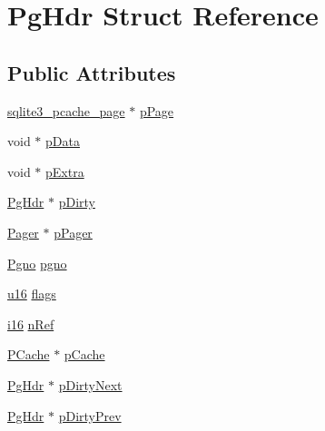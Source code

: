\hypertarget{struct_pg_hdr}{\section{Pg\-Hdr Struct Reference}
\label{struct_pg_hdr}
}
\subsection*{Public Attributes}
\begin{DoxyCompactItemize}
\item 
\hyperlink{structsqlite3__pcache__page}{sqlite3\-\_\-pcache\-\_\-page} $\ast$ \hyperlink{struct_pg_hdr_aa5645976ba0634993a7304dce8856c8b}{p\-Page}
\item 
void $\ast$ \hyperlink{struct_pg_hdr_a0f9f2ac8492c0cdad5898036db20b798}{p\-Data}
\item 
void $\ast$ \hyperlink{struct_pg_hdr_a8ff7430ed04077f1ae20d10801968164}{p\-Extra}
\item 
\hyperlink{struct_pg_hdr}{Pg\-Hdr} $\ast$ \hyperlink{struct_pg_hdr_a7732b1c0f19d9555ac93d4879fc95bbd}{p\-Dirty}
\item 
\hyperlink{struct_pager}{Pager} $\ast$ \hyperlink{struct_pg_hdr_aaa4879a9510c8a819a1e10a8ee21495b}{p\-Pager}
\item 
\hyperlink{sqlite3_8c_aec0c653e8dd16e4639caf2f8ea54f55c}{Pgno} \hyperlink{struct_pg_hdr_ab6e2223e410acf9bae7f12f1b1293589}{pgno}
\item 
\hyperlink{sqlite3_8c_a20f2299e322dcbde37cb07b16910b843}{u16} \hyperlink{struct_pg_hdr_a8ef58380f7e04f1e3c76fa208e227f95}{flags}
\item 
\hyperlink{sqlite3_8c_a7b32340f65cd15f029caad258fb3355c}{i16} \hyperlink{struct_pg_hdr_ac68c685d117788c18849e8853dd419d5}{n\-Ref}
\item 
\hyperlink{struct_p_cache}{P\-Cache} $\ast$ \hyperlink{struct_pg_hdr_a557aeaddd1b0805815ce06f1bfd27782}{p\-Cache}
\item 
\hyperlink{struct_pg_hdr}{Pg\-Hdr} $\ast$ \hyperlink{struct_pg_hdr_a61b56eb694ce445799963f7eb912e367}{p\-Dirty\-Next}
\item 
\hyperlink{struct_pg_hdr}{Pg\-Hdr} $\ast$ \hyperlink{struct_pg_hdr_a8392b45bb05d88c734020beb912304dc}{p\-Dirty\-Prev}
\end{DoxyCompactItemize}


